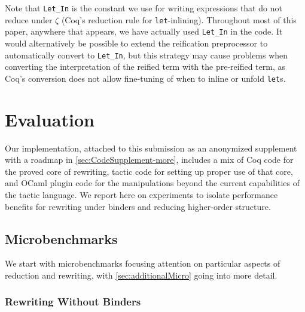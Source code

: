 Note that \texttt{Let_In} is the constant we use for writing  expressions that do not reduce under $\zeta$ (Coq's reduction rule for \texttt{let}-inlining).
Throughout most of this paper, anywhere that  appears, we have actually used \texttt{Let_In} in the code.
It would alternatively be possible to extend the reification preprocessor to automatically convert  to \texttt{Let_In}, but this strategy may cause problems when converting the interpretation of the reified term with the pre-reified term, as Coq's conversion does not allow fine-tuning of when to inline or unfold \texttt{let}s.

\section{Evaluation}\label{sec:evaluation}

Our implementation, attached to this submission as an anonymized supplement with a roadmap in \autoref{sec:CodeSupplement-more}, includes a mix of Coq code for the proved core of rewriting, tactic code for setting up proper use of that core, and OCaml plugin code for the manipulations beyond the current capabilities of the tactic language.
We report here on experiments to isolate performance benefits for rewriting under binders and reducing higher-order structure.

\subsection{Microbenchmarks} \label{sec:micro}

\def\NoBindersSubfloatNval{3}%
\def\NoBindersSubfloatXRow{\thisrowno{0}*(2^(\nval+1)-1)}%

We start with microbenchmarks focusing attention on particular aspects of reduction and rewriting, with \autoref{sec:additionalMicro} going into more detail.

\subsubsection{Rewriting Without Binders} \label{sec:micro:Plus0Tree}

